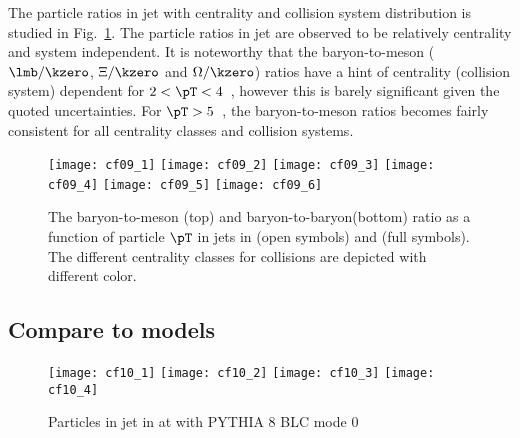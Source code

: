 The particle ratios in jet with centrality and collision system distribution is studied in Fig.~\ref{fig:pppPbRatio}. The particle ratios in jet are observed to be relatively centrality and system independent. It is noteworthy that the baryon-to-meson ($\lmb/\kzero$, $\Xi/\kzero$ and $\Omega/\kzero$) ratios have a hint of centrality (collision system) dependent for $2 < \pT < 4$~\GeVc, however this is barely significant given the quoted uncertainties. For $\pT > 5$~\GeVc, the baryon-to-meson ratios becomes fairly consistent for all centrality classes and collision systems. 
\begin{figure}[!ht]
	\begin{center}
		\texttt{[image: cf09\_1]}
		\texttt{[image: cf09\_2]}
		\texttt{[image: cf09\_3]}
		\texttt{[image: cf09\_4]}
		\texttt{[image: cf09\_5]}
		\texttt{[image: cf09\_6]}
	\end{center}
	\caption{The baryon-to-meson (top) and baryon-to-baryon(bottom) ratio as a function of particle $\pT$ in jets in \pp (open symbols) and \pPb (full symbols). The different centrality classes for \pPb collisions are depicted with different color.}
	\label{fig:pppPbRatio}
\end{figure}

\subsection{Compare to models}
\label{subsec:ComToMod}
\begin{figure}[!ht]
	\begin{center}
		\texttt{[image: cf10\_1]}
		\texttt{[image: cf10\_2]}
		\texttt{[image: cf10\_3]}
		\texttt{[image: cf10\_4]}

	\end{center}
	\caption{Particles in jet in \pPb at \fivenn with PYTHIA 8 BLC mode 0}
	\label{fig:pPbpyJESpect}
\end{figure}